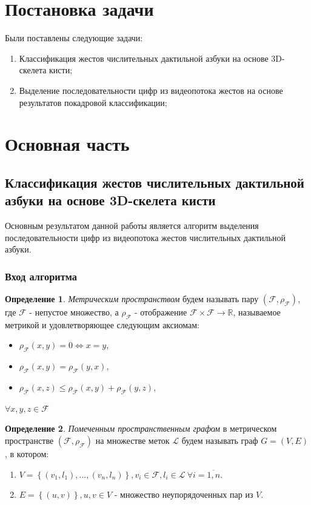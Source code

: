 \documentclass[12pt,a4paper]{article}
\theoremstyle{definition}
\newtheorem{mydef}{Определение}[section]
\begin{document}
\newpage 
\section{Постановка задачи} 
Были поставлены следующие задачи:
\begin{enumerate}
\item Классификация жестов числительных дактильной азбуки на основе 3D-скелета кисти;
\item Выделение последовательности цифр из видеопотока жестов на основе результатов покадровой классификации;
\end{enumerate}

\newpage
\section{Основная часть}
\subsection{Классификация жестов числительных дактильной азбуки на основе 3D-скелета кисти}
Основным результатом данной работы является алгоритм выделения последовательности цифр из видеопотока жестов числительных дактильной азбуки.
\subsubsection{Вход алгоритма}

\begin{mydef}
\emph{Метрическим пространством} будем называть пару $\left(\mathcal{F}, \rho_{\mathcal{F}}\right)$, где $\mathcal{F}$ - непустое множество, а $\rho_{\mathcal{F}}$ - отображение $\mathcal{F} \times \mathcal{F}  \rightarrow \mathbb{R}$, называемое метрикой и удовлетворяющее следующим аксиомам:
\begin{itemize}
\item $\rho_{\mathcal{F}}\left(x, y\right) = 0 \Leftrightarrow x = y$,
\item $\rho_{\mathcal{F}}\left(x, y\right) = \rho_{\mathcal{F}}\left(y, x\right)$,
\item $\rho_{\mathcal{F}}\left(x, z\right) \leq \rho_{\mathcal{F}}\left(x, y\right) + \rho_{\mathcal{F}}\left(y, z\right)$,
\end{itemize}
$\forall x, y, z \in \mathcal{F}$
\end{mydef}

\begin{mydef}
\emph{Помеченным пространственным графом} в метрическом пространстве $\left(\mathcal{F}, \rho_{\mathcal{F}}\right)$ на множестве меток $\mathcal{L}$ будем называть граф $G = (V, E)$, в котором:
\begin{enumerate}
\item $V=\left\{\left(v_1, l_1\right), ..., \left(v_n, l_n\right)\right\}, v_i \in \mathcal{F}, l_i \in \mathcal{L}\  \forall i = \overline{1, n}$.
\item $E=\left\{\left(u, v\right)\right\}, u, v \in V$ - множество неупорядоченных пар из $V$.
\end{enumerate}
\end{mydef}
\end{document}
